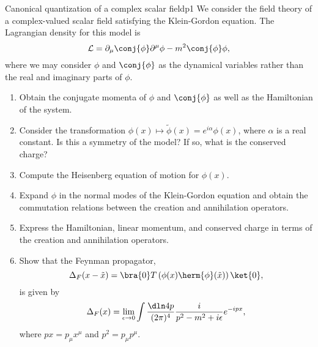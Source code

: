 \begin{problem}{Canonical quantization of a complex scalar field}{p1}
   We consider the field theory of a complex-valued scalar field satisfying the Klein-Gordon equation. The Lagrangian density for this model is
   \begin{equation*}
      \mathcal{L} = \partial_\mu \conj{\phi} \partial^\mu \phi - m^2 \conj{\phi} \phi,
   \end{equation*}
   where we may consider \(\phi\) and \(\conj{\phi}\) as the dynamical variables rather than the real and imaginary parts of \(\phi\).
   \begin{enumerate}[label=(\alph*)]
      \item Obtain the conjugate momenta of \(\phi\) and \(\conj{\phi}\) as well as the Hamiltonian of the system.
      \item Consider the transformation \(\phi(x) \mapsto \tilde{\phi}(x) = e^{i\alpha} \phi(x)\), where \(\alpha\) is a real constant. Is this a symmetry of the model? If so, what is the conserved charge?
      \item Compute the Heisenberg equation of motion for \(\phi(x).\)
      \item Expand \(\phi\) in the normal modes of the Klein-Gordon equation and obtain the commutation relations between the creation and annihilation operators.
      \item Express the Hamiltonian, linear momentum, and conserved charge in terms of the creation and annihilation operators.
      \item Show that the Feynman propagator,
         \begin{equation*}
            \Delta_F(x - \tilde{x}) = \bra{0}T\left(\phi(x) \herm{\phi}(\tilde{x})\right)\ket{0},
         \end{equation*}
         is given by
         \begin{equation*}
            \Delta_F(x) =  \lim_{\epsilon \to 0}{\int \frac{\dln4p}{(2\pi)^4} \frac{i}{p^2 - m^2 + i \epsilon} e^{-i px}},
         \end{equation*}
         where \(px = p_\mu x^\mu\) and \(p^2 = p_\mu p^\mu\).
   \end{enumerate}
\end{problem}
